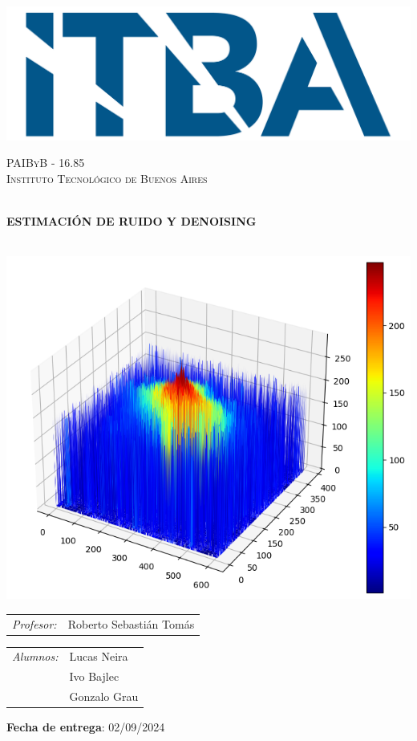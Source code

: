 \begin{center}

\includegraphics[scale=0.1]{figures/itba_logo}
\vspace{1cm}

\textsc{\LARGE PAIByB - 16.85}\\[0.2cm]
\textsc{\Large Instituto Tecnológico de Buenos Aires}\\[0.2cm]
\vspace{1cm}

\HRule \\[0.2cm]
{ \huge \bfseries  ESTIMACIÓN DE RUIDO Y DENOISING \\[0.2cm] }
\HRule \\[1cm]

\vspace{1cm}

\includegraphics[width=0.5\linewidth]{figures/caratula}


\vspace{1cm}
\begin{multicols}{2}

\begin{tabular}{l l}
  \emph{Profesor:}   &  Roberto Sebastián Tomás \\
\end{tabular}


\columnbreak

\begin{tabular}{l l}
  \emph{Alumnos:}   &  Lucas Neira \\
                    &  Ivo Bajlec \\
                    &  Gonzalo Grau \\
\end{tabular}

\end{multicols}
\vspace{1cm}

\textbf{Fecha de entrega}: 02/09/2024

\end{center}


